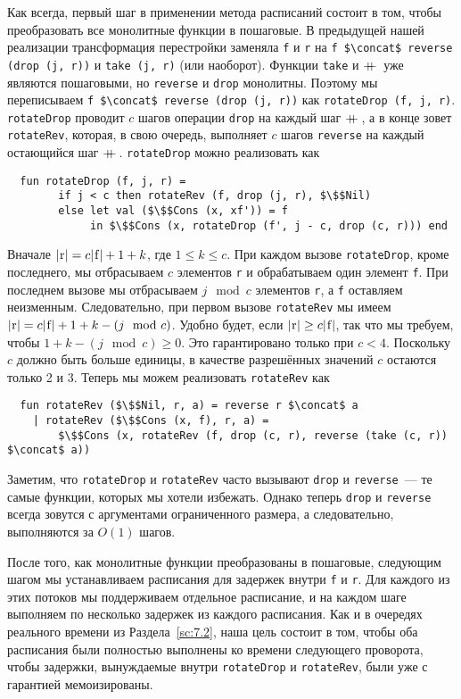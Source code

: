 Как всегда, первый шаг в применении метода расписаний состоит в том,
чтобы преобразовать все монолитные функции в пошаговые. В предыдущей
нашей реализации трансформация перестройки заменяла \lstinline!f! и
\lstinline!r! на
\lstinline!f $\concat$ reverse (drop (j, r))! и
\lstinline!take (j, r)! (или наоборот). Функции \lstinline!take! и
$+\!\!\!+\,$ уже являются пошаговыми, но \lstinline!reverse! и
\lstinline!drop! монолитны. Поэтому мы переписываем
\lstinline!f $\concat$ reverse (drop (j, r))! как
\lstinline!rotateDrop (f, j, r)!. \lstinline!rotateDrop! проводит $c$
шагов операции \lstinline!drop! на каждый шаг $+\!\!\!+\,$, а в конце
зовет \lstinline!rotateRev!, которая, в свою очередь, выполняет $c$
шагов \lstinline!reverse! на каждый остающийся шаг
$+\!\!\!+\,$. \lstinline!rotateDrop! можно реализовать как
\begin{lstlisting}
  fun rotateDrop (f, j, r) =
        if j < c then rotateRev (f, drop (j, r), $\$$Nil)
        else let val ($\$$Cons (x, xf')) = f
             in $\$$Cons (x, rotateDrop (f', j - c, drop (c, r))) end
\end{lstlisting}
Вначале $|\lstinline!r!| = c|\lstinline!f!| + 1 + k$, где $1 \le k \le
c$. При каждом вызове \lstinline!rotateDrop!, кроме последнего, мы отбрасываем $c$
элементов \lstinline!r! и обрабатываем один элемент \lstinline!f!. При
последнем вызове мы отбрасываем $j \mod c$ элементов \lstinline!r!, а
\lstinline!f! оставляем неизменным. Следовательно, при первом вызове
\lstinline!rotateRev! мы имеем $|\lstinline!r!| = c|\lstinline!f!| + 1
+ k - (j \mod c)$. Удобно будет, если $|\lstinline!r!|
\ge c|\lstinline!f!|$, так что мы требуем, чтобы $1 + k - (j \mod c)
\ge 0$. Это гарантировано только при $c < 4$. Поскольку $c$ должно
быть больше единицы, в качестве разрешённых значений $c$ остаются
только 2 и 3. Теперь мы можем реализовать \lstinline!rotateRev! как
\begin{lstlisting}
  fun rotateRev ($\$$Nil, r, a) = reverse r $\concat$ a
    | rotateRev ($\$$Cons (x, f), r, a) =
        $\$$Cons (x, rotateRev (f, drop (c, r), reverse (take (c, r)) $\concat$ a))
\end{lstlisting}
Заметим, что \lstinline!rotateDrop! и \lstinline!rotateRev! часто
вызывают \lstinline!drop! и \lstinline!reverse!~--- те самые функции,
которых мы хотели избежать. Однако теперь \lstinline!drop! и
\lstinline!reverse! всегда зовутся с аргументами ограниченного
размера, а следовательно, выполняются за $O(1)$ шагов.

После того, как монолитные функции преобразованы в пошаговые,
следующим шагом мы устанавливаем расписания для задержек внутри
\lstinline!f! и \lstinline!r!. Для каждого из этих потоков мы
поддерживаем отдельное расписание, и на каждом шаге выполняем по
несколько задержек из каждого расписания. Как и в очередях реального
времени из Раздела~\ref{sc:7.2}, наша цель состоит в том, чтобы оба
расписания были полностью выполнены ко времени следующего проворота,
чтобы задержки, вынуждаемые внутри \lstinline!rotateDrop! и
\lstinline!rotateRev!, были уже с гарантией мемоизированы.

